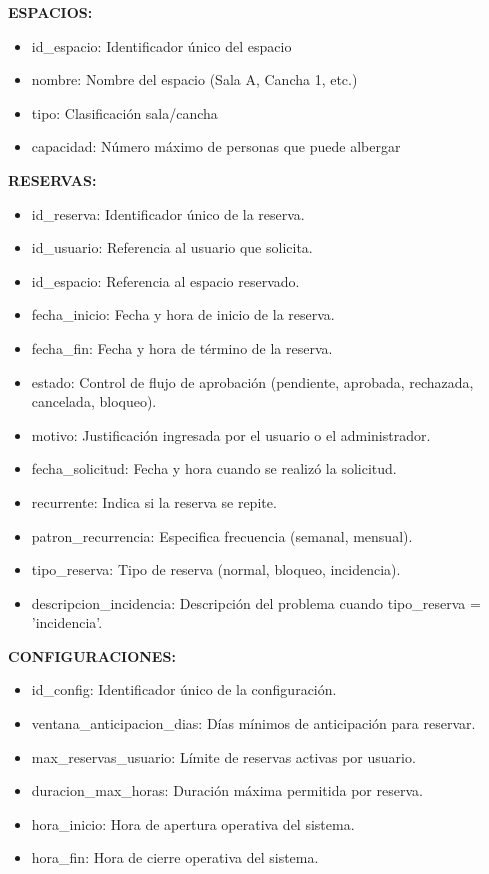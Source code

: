 \documentclass[a4paper, titlepage, 12pt]{article}
\begin{document}
\textbf{ESPACIOS:}
\begin{itemize}
    \item id\_espacio: Identificador único del espacio
    \item nombre: Nombre del espacio (Sala A, Cancha 1, etc.)
    \item tipo: Clasificación sala/cancha
    \item capacidad: Número máximo de personas que puede albergar
\end{itemize}

\textbf{RESERVAS:}
\begin{itemize}
    \item id\_reserva: Identificador único de la reserva.
    \item id\_usuario: Referencia al usuario que solicita.
    \item id\_espacio: Referencia al espacio reservado.
    \item fecha\_inicio: Fecha y hora de inicio de la reserva.
    \item fecha\_fin: Fecha y hora de término de la reserva.
    \item estado: Control de flujo de aprobación (pendiente, aprobada, rechazada, cancelada, bloqueo).
    \item motivo: Justificación ingresada por el usuario o el administrador.
    \item fecha\_solicitud: Fecha y hora cuando se realizó la solicitud.
    \item recurrente: Indica si la reserva se repite.
    \item patron\_recurrencia: Especifica frecuencia (semanal, mensual).
    \item tipo\_reserva: Tipo de reserva (normal, bloqueo, incidencia).
    \item descripcion\_incidencia: Descripción del problema cuando tipo\_reserva = 'incidencia'.
\end{itemize}

\textbf{CONFIGURACIONES:}
\begin{itemize}
    \item id\_config: Identificador único de la configuración.
    \item ventana\_anticipacion\_dias: Días mínimos de anticipación para reservar.
    \item max\_reservas\_usuario: Límite de reservas activas por usuario.
    \item duracion\_max\_horas: Duración máxima permitida por reserva.
    \item hora\_inicio: Hora de apertura operativa del sistema.
    \item hora\_fin: Hora de cierre operativa del sistema.
\end{itemize}
\end{document}
